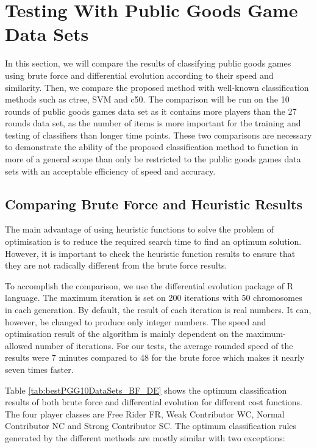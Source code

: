 \section{Testing With Public Goods Game Data Sets}
In this section, we will compare the results of classifying public goods games using brute force and differential evolution according to their speed and similarity. Then, we compare the proposed method with well-known classification methods such as ctree, SVM and c50. The comparison will be run on the 10 rounds of public goods games data set as it contains more players than the 27 rounds data set, as the number of items is more important for the training and testing of classifiers than longer time points. These two comparisons are necessary to demonstrate the ability of the proposed classification method to function in more of a general scope than only be restricted to the public goods games data sets with an acceptable efficiency of speed and accuracy.

\subsection{Comparing Brute Force and Heuristic Results}

The main advantage of using heuristic functions to solve the problem of optimisation is to reduce the required search time to find an optimum solution. However, it is important to check the heuristic function results to ensure that they are not radically different from the brute force results.

To accomplish the comparison, we use the differential evolution package \cite{Ardia2015} of R language. The maximum iteration is set on 200 iterations with 50 chromosomes in each generation. By default, the result of each iteration is real numbers. It can, however, be changed to produce only integer numbers. The speed and optimisation result of the algorithm is mainly dependent on the maximum-allowed number of iterations. For our tests, the average rounded speed of the results were 7 minutes compared to 48 for the brute force which makes it nearly seven times faster.

Table \ref{tab:bestPGG10DataSets_BF_DE} shows the optimum classification results of both brute force and differential evolution for different cost functions.  The four player classes are Free Rider FR, Weak Contributor WC, Normal Contributor NC and Strong Contributor SC. The optimum classification rules generated by the different methods are mostly similar with two exceptions:

